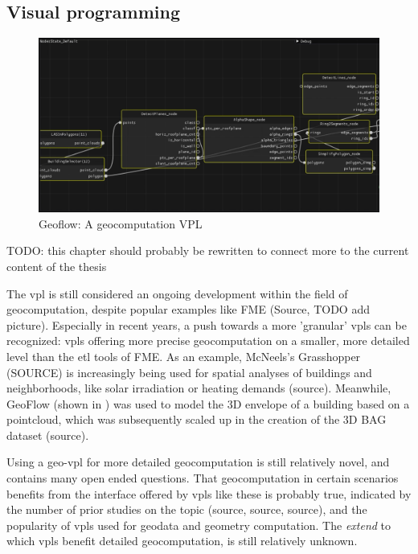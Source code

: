 \subsection*{Visual programming}

\begin{figure}
  \centering
  \graphicspath{{../../assets/images/background/geo-vpl/}}
  \includegraphics[width=\linewidth]{geoflow.png}
  \caption{Geoflow: A geocomputation VPL}
  \label{fig:1:geoflow}
\end{figure}

\begin{note}
  TODO: this chapter should probably be rewritten to connect more to the current content of the thesis
\end{note}

The \ac{vpl} is still considered an ongoing development within the field of geocomputation, despite popular examples like FME (Source, TODO add picture). 
Especially in recent years, a push towards a more 'granular' \ac{vpl}s can be recognized: 
\ac{vpl}s offering more precise geocomputation on a smaller, more detailed level than the \ac{etl} tools of FME. 
As an example, McNeels's Grasshopper (SOURCE) is increasingly being used for spatial analyses of buildings and neighborhoods, like solar irradiation or heating demands (source). 
Meanwhile, GeoFlow (shown in ) was used to model the 3D envelope of a building based on a pointcloud, which was subsequently scaled up in the creation of the 3D BAG dataset (source).

Using a \ac{geo-vpl} for more detailed geocomputation is still relatively novel, and contains many open ended questions. That geocomputation in certain scenarios benefits from the interface offered by \ac{vpl}s like these is probably true, indicated by the number of prior studies on the topic (source, source, source), and the popularity of \ac{vpl}s used for geodata and geometry computation. The \emph{extend} to which \ac{vpl}s benefit detailed geocomputation, is still relatively unknown. 

